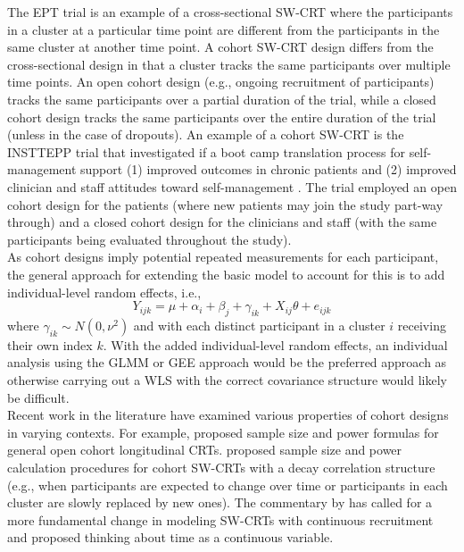 \documentclass[10pt]{article}
\begin{document}
The EPT trial is an example of a cross-sectional SW-CRT where the participants in a cluster at a particular time point are different from the participants in the same cluster at another time point. A cohort SW-CRT design differs from the cross-sectional design in that a cluster tracks the same participants over multiple time points. An open cohort design (e.g., ongoing recruitment of participants) tracks the same participants over a partial duration of the trial, while a closed cohort design tracks the same participants over the entire duration of the trial (unless in the case of dropouts). An example of a cohort SW-CRT is the INSTTEPP trial that investigated if a boot camp translation process for self-management support (1) improved outcomes in chronic patients and (2) improved clinician and staff attitudes toward self-management \parencite{Nease:2018}. The trial employed an open cohort design for the patients (where new patients may join the study part-way through) and a closed cohort design for the clinicians and staff (with the same participants being evaluated throughout the study).
\\

As cohort designs imply potential repeated measurements for each participant, the general approach for extending the basic model to account for this is to add individual-level random effects, i.e.,
\[
Y_{ijk} = \mu + \alpha_i + \beta_j + \gamma_{ik} + X_{ij}\theta + e_{ijk}
\]
where $\gamma_{ik}\sim N(0,\nu^2)$ and with each distinct participant in a cluster $i$ receiving their own index $k$. With the added individual-level random effects, an individual analysis using the GLMM or GEE approach would be the preferred approach as otherwise carrying out a WLS with the correct covariance structure would likely be difficult.
\\

Recent work in the literature have examined various properties of cohort designs in varying contexts. For example, \textcite{Kasza:2020} proposed sample size and power formulas for general open cohort longitudinal CRTs. \textcite{Li:2020} proposed sample size and power calculation procedures for cohort SW-CRTs with a decay correlation structure (e.g., when participants are expected to change over time or participants in each cluster are slowly replaced by new ones). The commentary by \textcite{Hooper:2019} has called for a more fundamental change in modeling SW-CRTs with continuous recruitment and proposed thinking about time as a continuous variable.
\end{document}
